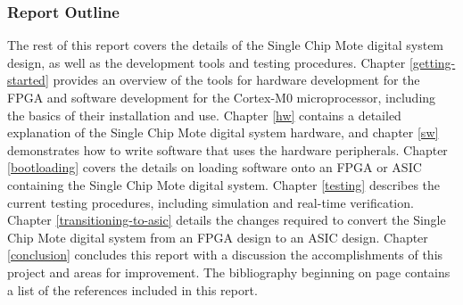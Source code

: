 \subsubsection{Report Outline}
The rest of this report covers the details of the Single Chip Mote digital system design, as well as the development tools and testing procedures. Chapter \ref{getting-started} provides an overview of the tools for hardware development for the FPGA and software development for the Cortex-M0 microprocessor, including the basics of their installation and use. Chapter \ref{hw} contains a detailed explanation of the Single Chip Mote digital system hardware, and chapter \ref{sw} demonstrates how to write software that uses the hardware peripherals. Chapter \ref{bootloading} covers the details on loading software onto an FPGA or ASIC containing the Single Chip Mote digital system. Chapter \ref{testing} describes the current testing procedures, including simulation and real-time verification. Chapter \ref{transitioning-to-asic} details the changes required to convert the Single Chip Mote digital system from an FPGA design to an ASIC design. Chapter \ref{conclusion} concludes this report with a discussion the accomplishments of this project and areas for improvement. The bibliography beginning on page \pageref{bib} contains a list of the references included in this report.
